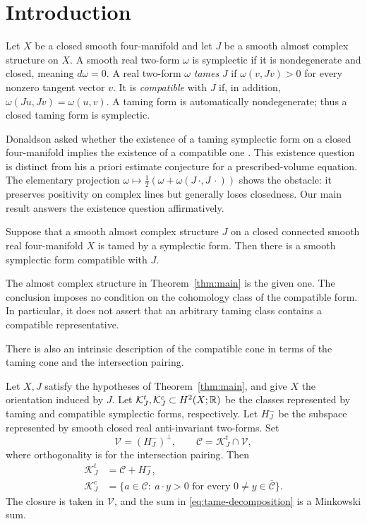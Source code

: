 \section{Introduction}

Let \(X\) be a closed smooth four-manifold and let \(J\) be a smooth
almost complex structure on \(X\). A smooth real two-form \(\omega\)
is symplectic if it is nondegenerate and closed, meaning
\(d\omega=0\). A real two-form \(\omega\)
\emph{tames} \(J\) if \(\omega(v,Jv)>0\) for every nonzero tangent
vector \(v\). It is \emph{compatible} with \(J\) if, in addition,
\(\omega(Ju,Jv)=\omega(u,v)\). A taming form is automatically
nondegenerate; thus a closed taming form is symplectic.

Donaldson asked whether the existence of a taming symplectic form
on a closed four-manifold implies the existence of a compatible
one \cite[Section~5.2, Question~2]{Donaldson2006}.
This existence question is distinct from his a priori estimate
conjecture for a prescribed-volume equation.
The elementary projection
\(\omega\mapsto \frac12(\omega+\omega(J\,\cdot,J\,\cdot))\)
shows the obstacle: it preserves positivity on complex lines
but generally loses closedness. Our main result answers the
existence question affirmatively.

\begin{theorem}\label{thm:main}
Suppose that a smooth almost complex structure \(J\) on a closed
connected smooth real four-manifold \(X\) is tamed by a symplectic
form. Then there is a smooth symplectic form compatible with \(J\).
\end{theorem}

The almost complex structure in Theorem~\ref{thm:main} is the given
one. The conclusion imposes no condition on the cohomology class of
the compatible form. In particular, it does not assert that an
arbitrary taming class contains a compatible representative.

There is also an intrinsic description of the compatible cone in terms
of the taming cone and the intersection pairing.

\begin{theorem}\label{thm:taming-cones}
Let \(X,J\) satisfy the hypotheses of Theorem~\ref{thm:main}, and give
\(X\) the orientation induced by \(J\). Let
\(\mathcal K_J^t,\mathcal K_J^c\subset H^2(X;\mathbb R)\) be the classes
represented by taming and compatible symplectic forms, respectively.
Let \(H_J^-\) be the subspace represented by smooth closed real
anti-invariant two-forms. Set
\[
 \mathcal V=(H_J^-)^\perp,\qquad
 \mathcal C=\mathcal K_J^t\cap\mathcal V,
\]
where orthogonality is for the intersection pairing. Then
\begin{align}
 \mathcal K_J^t&=\mathcal C+H_J^-,\label{eq:tame-decomposition}\\
 \mathcal K_J^c&=
 \{a\in\mathcal C:\ a\cdot y>0
   \text{ for every }0\ne y\in\overline{\mathcal C}\}.
 \label{eq:compatible-duality}
\end{align}
The closure is taken in \(\mathcal V\), and the sum in
\eqref{eq:tame-decomposition} is a Minkowski sum.
\end{theorem}


